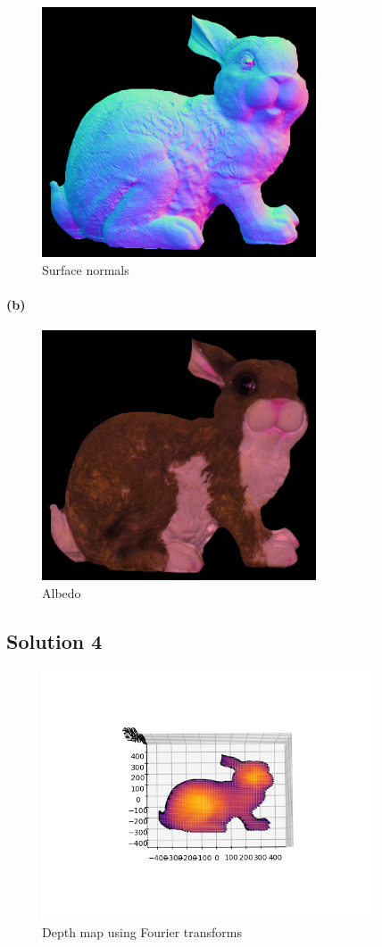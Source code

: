 \documentclass{article}
\newcommand{\solution}[1]{\clearpage \subsection*{Solution #1}}
\newcommand{\spart}[1]{\paragraph{(#1)}}
\begin{document}
\begin{figure}[!h]
  \centering
  \includegraphics[height=20em]{code/outputs/prob3_nrm.png}
  \caption{Surface normals}
\end{figure}

\spart{b}

\begin{figure}[!h]
  \centering
  \includegraphics[height=20em]{code/outputs/prob3_alb.png}
  \caption{Albedo}
\end{figure}

\solution{4}

\begin{figure}[!h]
  \centering
  \includegraphics[height=20em]{prob4.png}
  \caption{Depth map using Fourier transforms}
\end{figure}
\end{document}
